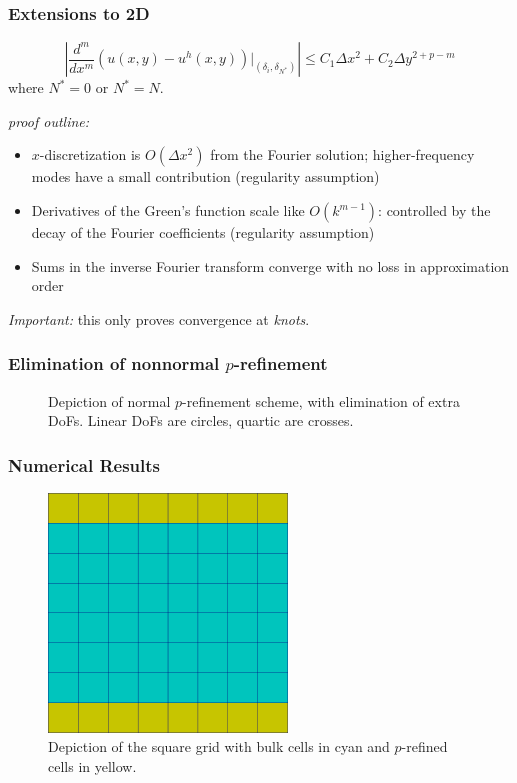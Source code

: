 \documentclass[8pt]{beamer}
\begin{document}
\begin{frame}
    \frametitle{Extensions to 2D}
    \begin{equation*}
        \left|
        \dfrac{d^m}{dx^m}
        \left(u(x, y) - u^h(x, y) \right)
        \bigg|_{(\delta_i, \delta_{N^*})}
        \right|
        \leq
        C_1 \Delta x^{2}
        +
        C_2 \Delta y^{2 + p - m}
    \end{equation*}
    where \(N^* = 0\) or \(N^* = N\).

    \emph{proof outline:}
    \begin{itemize}
        \item \(x\)-discretization is \(O(\Delta x^2)\) from the Fourier
              solution; higher-frequency modes have a small contribution
              (regularity assumption)
        \item Derivatives of the Green's function scale like \(O(k^{m - 1})\):
              controlled by the decay of the Fourier coefficients (regularity
              assumption)
        \item Sums in the inverse Fourier transform converge with no loss in
              approximation order
    \end{itemize}

    \emph{Important:} this only proves convergence at \emph{knots}.
\end{frame}

\begin{frame}
    \frametitle{Elimination of nonnormal \(p\)-refinement}
    \begin{figure}
        \centering

        
        \caption{Depiction of normal \(p\)-refinement scheme, with elimination
        of extra DoFs. Linear DoFs are circles, quartic are crosses.}
    \end{figure}
\end{frame}

\begin{frame}
    \frametitle{Numerical Results}
    \begin{figure}
        \centering
        \includegraphics[width=2.5in]{Pictures/square-periodic-grid.png}

        \caption{Depiction of the square grid with bulk cells in cyan and
        \(p\)-refined cells in yellow.}
    \end{figure}
\end{frame}
\end{document}
